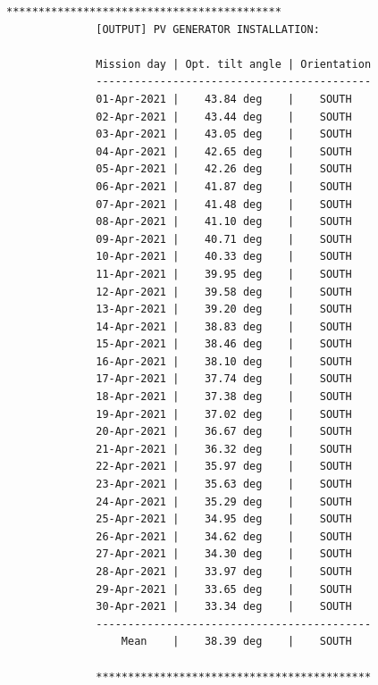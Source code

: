 \begin{lstfloat}
\begin{lstlisting}[numbers = none, caption = {Output of the \MATLAB simulation in appendix \ref{sec:matlab_code} regarding the installation of the PV generator for the mission inputs in the table \ref{tab:table_vienna}.}, label = lst:list_negev_3, captionpos = b]
              *******************************************
              [OUTPUT] PV GENERATOR INSTALLATION:

              Mission day | Opt. tilt angle | Orientation
              -------------------------------------------
              01-Apr-2021 |    43.84 deg    |    SOUTH
              02-Apr-2021 |    43.44 deg    |    SOUTH
              03-Apr-2021 |    43.05 deg    |    SOUTH
              04-Apr-2021 |    42.65 deg    |    SOUTH
              05-Apr-2021 |    42.26 deg    |    SOUTH
              06-Apr-2021 |    41.87 deg    |    SOUTH
              07-Apr-2021 |    41.48 deg    |    SOUTH
              08-Apr-2021 |    41.10 deg    |    SOUTH
              09-Apr-2021 |    40.71 deg    |    SOUTH
              10-Apr-2021 |    40.33 deg    |    SOUTH
              11-Apr-2021 |    39.95 deg    |    SOUTH
              12-Apr-2021 |    39.58 deg    |    SOUTH
              13-Apr-2021 |    39.20 deg    |    SOUTH
              14-Apr-2021 |    38.83 deg    |    SOUTH
              15-Apr-2021 |    38.46 deg    |    SOUTH
              16-Apr-2021 |    38.10 deg    |    SOUTH
              17-Apr-2021 |    37.74 deg    |    SOUTH
              18-Apr-2021 |    37.38 deg    |    SOUTH
              19-Apr-2021 |    37.02 deg    |    SOUTH
              20-Apr-2021 |    36.67 deg    |    SOUTH
              21-Apr-2021 |    36.32 deg    |    SOUTH
              22-Apr-2021 |    35.97 deg    |    SOUTH
              23-Apr-2021 |    35.63 deg    |    SOUTH
              24-Apr-2021 |    35.29 deg    |    SOUTH
              25-Apr-2021 |    34.95 deg    |    SOUTH
              26-Apr-2021 |    34.62 deg    |    SOUTH
              27-Apr-2021 |    34.30 deg    |    SOUTH
              28-Apr-2021 |    33.97 deg    |    SOUTH
              29-Apr-2021 |    33.65 deg    |    SOUTH
              30-Apr-2021 |    33.34 deg    |    SOUTH
              -------------------------------------------
                  Mean    |    38.39 deg    |    SOUTH

              *******************************************
\end{lstlisting}
\end{lstfloat}
